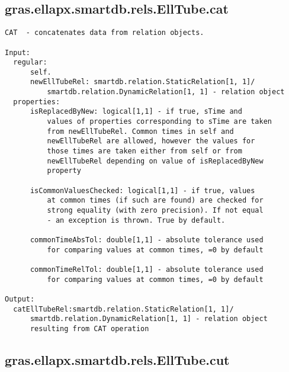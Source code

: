 \subsection{\texorpdfstring{gras.ellapx.smartdb.rels.EllTube.cat}{cat}}\label{method:gras.ellapx.smartdb.rels.EllTube.cat}
\begin{verbatim}
CAT  - concatenates data from relation objects.

Input:
  regular:
      self.
      newEllTubeRel: smartdb.relation.StaticRelation[1, 1]/
          smartdb.relation.DynamicRelation[1, 1] - relation object
  properties:
      isReplacedByNew: logical[1,1] - if true, sTime and
          values of properties corresponding to sTime are taken
          from newEllTubeRel. Common times in self and
          newEllTubeRel are allowed, however the values for
          those times are taken either from self or from
          newEllTubeRel depending on value of isReplacedByNew
          property

      isCommonValuesChecked: logical[1,1] - if true, values
          at common times (if such are found) are checked for
          strong equality (with zero precision). If not equal
          - an exception is thrown. True by default.

      commonTimeAbsTol: double[1,1] - absolute tolerance used
          for comparing values at common times, =0 by default

      commonTimeRelTol: double[1,1] - absolute tolerance used
          for comparing values at common times, =0 by default

Output:
  catEllTubeRel:smartdb.relation.StaticRelation[1, 1]/
      smartdb.relation.DynamicRelation[1, 1] - relation object
      resulting from CAT operation
\end{verbatim}
\subsection{\texorpdfstring{gras.ellapx.smartdb.rels.EllTube.cut}{cut}}\label{method:gras.ellapx.smartdb.rels.EllTube.cut}
\begin{verbatim}

\end{verbatim}
